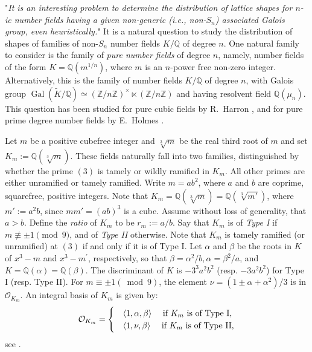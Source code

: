 \documentclass[table]{amsart}
\newcommand{\Z}{\mathbb{Z}}
\newcommand{\Q}{\mathbb{Q}}
\newcommand{\cO}{\mathcal{O}}
\newcommand{\op}[1]{\operatorname{#1}}
\numberwithin{equation}{section}
\begin{document}
"\emph{It is an interesting problem to determine the distribution of lattice shapes for $n$-ic number fields having a given non-generic (i.e., non-$S_n$) associated Galois group, even heuristically.}" It is a natural question to study the distribution of shapes of families of non-$S_n$ number fields $K/\Q$ of degree $n$. One natural family to consider is the family of \emph{pure number fields} of degree $n$, namely, number fields of the form $K=\Q(m^{1/n})$, where $m$ is an $n$-power free non-zero integer. Alternatively, this is the family of number fields $K/\Q$ of degree $n$, with Galois group $\op{Gal}(\widetilde{K}/\Q)\simeq (\Z/n\Z)^\times \ltimes (\Z/n\Z)$ and having resolvent field $\Q(\mu_n)$. This question has been studied for pure cubic fields by R.~Harron \cite{Har17}, and for pure prime degree number fields by E.~Holmes \cite{Hol22}. \par Let $m$ be a positive cubefree integer and $\sqrt[3]{m}$ be the real third root of $m$ and set $K_m:= \Q(\sqrt[3]{m})$. These fields naturally fall into two families, distinguished by whether the prime $(3)$ is tamely or wildly ramified in $K_m$. All other primes are either unramified or tamely ramified. Write $m = ab^2$, where $a$ and $b$ are coprime, squarefree, positive integers. Note that $K_m = \Q(\sqrt[3]{m}) = \Q(\sqrt[3]{m'})$, where $m' := a^2b$, since $mm' = (ab)^3$ is a cube. Assume without loss of generality, that $a > b$. Define the \emph{ratio} of $K_m$ to be $r_m := a/b$. Say that $K_m$ is of \emph{Type \rm{I}} if $m \not\equiv \pm1 \pmod{9}$, and of \emph{Type \rm{II}} otherwise. Note that $K_m$ is tamely ramified (or unramified) at $(3)$ if and only if it is of Type \rm{I}. Let $\alpha$ and $\beta$ be the roots in $K$ of $x^{3}-m$ and $x^{3}-m^{\prime}$, respectively, so that $\beta=\alpha^{2} / b, \alpha=\beta^{2} / a$, and $K=\Q(\alpha)=\Q(\beta)$. The discriminant of $K$ is $-3^{3} a^{2} b^{2}$ (resp. $-3 a^{2} b^{2}$) for Type \rm{I} (resp. Type \rm{II}). For $m \equiv \pm 1(\bmod 9)$, the element $\nu=\left(1 \pm \alpha+\alpha^{2}\right) / 3$ is in $\cO_{K_m}$. An integral basis of $K_m$ is given by:
\[\begin{split}
    \cO_{K_m}=\begin{cases}
        & \langle 1, \alpha, \beta\rangle \quad \text{ if }K_m\text{ is of Type \rm{I}},\\
       & \langle 1, \nu, \beta\rangle \quad \text{ if }K_m\text{ is of Type \rm{II}},\\
    \end{cases}
\end{split}\]
see \cite[Lemma 2.1]{Har17}.
\end{document}
